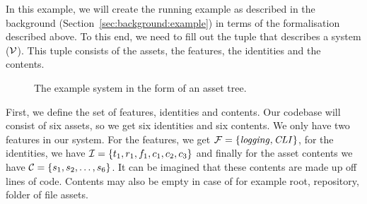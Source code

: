 \begin{example}\label{example:basicsystem}
In this example, we will create the running example as described in the background
(Section~\ref{sec:background:example}) in terms of the formalisation described above.
To this end, we need to fill out the tuple that describes a system (\( \mathcal{V} \)).
This tuple consists of the assets, the features, the identities and the contents.
\end{example}
\begin{figure}
  \centering
  \caption{The example system in the form of an asset tree.}
  \label{fig:example:basicsystem}
\end{figure}
First, we define the set of features, identities and contents. Our codebase
will consist of six assets, so we get six identities and six contents. We only
have two features in our system. For the features, we get \( \mathcal{F} = \left\{ \mathit{logging}, \mathit{CLI} \right\} \),
for the identities, we have \( \mathcal{I} = \left\{ t_1, r_1, f_1, c_1, c_2, c_3 \right\} \)
and finally for the asset contents we have \( \mathcal{C} = \left\{ s_1, s_2, \dots, s_6 \right\} \).
It can be imagined that these contents are made up off lines of code. Contents
may also be empty in case of for example root, repository, folder of file assets.

